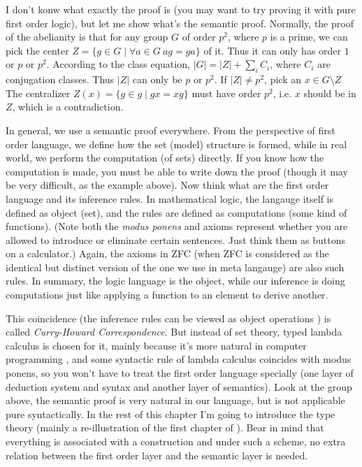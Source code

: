 I don't konw what exactly the proof is (you may want to try proving it 
with pure first order logic), but let me show what's the semantic proof. 
Normally, the proof of the abelianity is that for any group $G$ of order 
$p^2$, where $p$ is a prime, we can pick the center 
$Z =  \{g\in G\mid\forall a\in G\ ag=ga\}$ of it. Thus it can only has 
order $1$ or $p$ or $p^2$. According to the class equation, 
$|G| = |Z| + \sum_iC_i$, where $C_i$ are conjugation classes. Thus $|Z|$
can only be $p$ or $p^2$. If $|Z|\neq p^2$, pick an $x\in G\setminus Z$
The centralizer $Z(x) = \{g\in g\mid gx=xg\}$ must have order $p^2$, i.e.
$x$ should be in $Z$, which is a contradiction.

In general, we use a semantic proof everywhere. From the perspective of
first order language, we define how the set (model) structure is formed,
while in real world, we perform the computation (of sets) directly. If
you know how the computation is made, you must be able to write down the
proof (though it may be very difficult, as the example above). Now think
what are the first order language and its inference rules. In mathematical 
logic, the langauge itself is defined as object (set), and the rules are
defined as computations (some kind of functions). (Note both the 
{\it modus ponens} and axioms represent whether you are allowed to 
introduce or eliminate certain sentences. Just think them as buttons on
a calculator.) Again, the axioms in ZFC (when ZFC is considered as the
identical but distinct version of the one we use in meta langauge) are 
also such rules. In summary, the logic language is the object, while our
inference is doing computations just like applying a function to an
element to derive another. 

This coincidence (the inference rules can be viewed as 
object operations ) is called {\it Curry-Howard 
Correspondence}. But instead of set theory, typed lambda calculus
\cite{Curry-Howard} is chosen for it, mainly because it's more natural 
in computer programming \cite{coq,SF}, and some syntactic rule of lambda 
calculus coincides with modus ponens, so you won't have to treat the 
first order language specially
(one layer of deduction system and syntax and another layer of semantics). 
Look at the group above, the semantic proof is very natural in our 
language, but is not applicable pure syntactically. In the rest of this 
chapter I'm going to introduce the type theory (mainly a re-illustration 
of the first chapter of \cite{homotopy-type-theory}). Bear in mind that 
everything is associated with a construction and under such a scheme, 
no extra relation between the first order layer and the semantic layer
is needed. 

